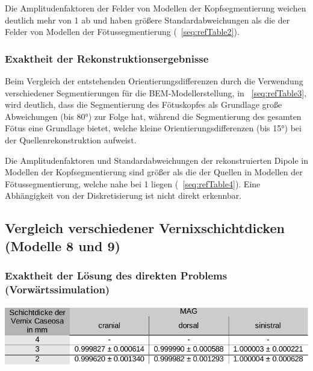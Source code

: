 Die Amplitudenfaktoren der Felder von Modellen der Kopfsegmentierung
weichen deutlich mehr von 1 ab und haben größere Standardabweichungen
als die der Felder von Modellen der Fötussegmentierung
(\tablename~\ref{seq:refTable2}).

\subsubsection{Exaktheit der Rekonstruktionsergebnisse}
Beim Vergleich der entstehenden Orientierungsdifferenzen durch die
Verwendung verschiedener Segmentierungen für die BEM-Modellerstellung,
in \tablename~\ref{seq:refTable3}, wird deutlich, dass die
Segmentierung des Fötuskopfes als Grundlage große Abweichungen (bis
80°) zur Folge hat, während die Segmentierung des gesamten Fötus eine
Grundlage bietet, welche kleine Orientierungsdifferenzen (bis 15°) bei
der Quellenrekonstruktion aufweist.

Die Amplitudenfaktoren und Standardabweichungen der rekonstruierten
Dipole in Modellen der Kopfsegmentierung sind größer als die der
Quellen in Modellen der Fötussegmentierung, welche nahe bei 1 liegen
(\tablename~\ref{seq:refTable4}). Eine Abhängigkeit von der
Diskretisierung ist nicht direkt erkennbar.

\subsection{Vergleich verschiedener Vernixschichtdicken (Modelle 8 und
9)}
\subsubsection{Exaktheit der Lösung des direkten Problems
(Vorwärtssimulation)}


\begin{center}
\begin{minipage}{17cm}
\label{seq:refTable7}
\includegraphics[width=13.951cm,height=2.699cm]{BA-img/BA-img20.pdf}\end{minipage}
\end{center}


